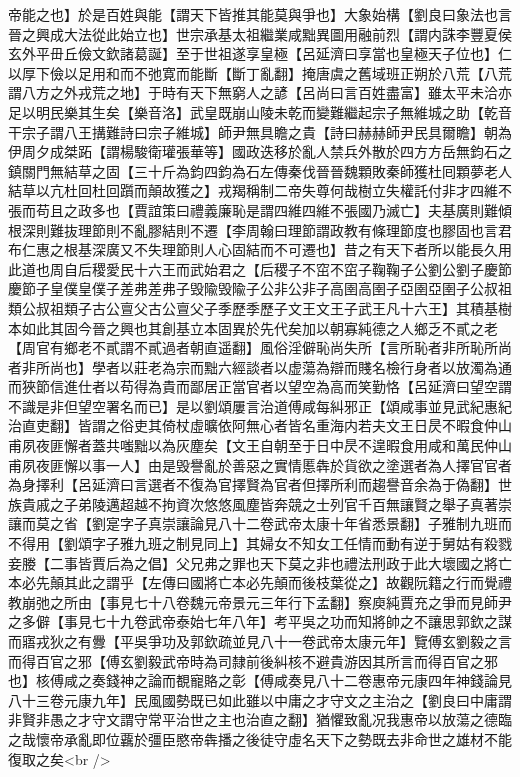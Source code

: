 帝能之也】於是百姓與能【謂天下皆推其能莫與爭也】大象始構【劉良曰象法也言晉之興成大法從此始立也】世宗承基太祖繼業咸黜異圖用融前烈【謂内誅李豐夏侯玄外平毌丘儉文欽諸葛誕】至于世祖遂享皇極【呂延濟曰享當也皇極天子位也】仁以厚下儉以足用和而不弛寛而能斷【斷丁亂翻】掩唐虞之舊域班正朔於八荒【八荒謂八方之外戎荒之地】于時有天下無窮人之諺【呂尚曰言百姓盡富】雖太平未洽亦足以明民樂其生矣【樂音洛】武皇既崩山陵未乾而變難繼起宗子無維城之助【乾音干宗子謂八王搆難詩曰宗子維城】師尹無具瞻之貴【詩曰赫赫師尹民具爾瞻】朝為伊周夕成桀跖【謂楊駿衛瓘張華等】國政迭移於亂人禁兵外散於四方方岳無鈞石之鎮關門無結草之固【三十斤為鈞四鈞為石左傳秦伐晉晉魏顆敗秦師獲杜囘顆夢老人結草以亢杜回杜回躓而顛故獲之】戎羯稱制二帝失尊何哉樹立失權託付非才四維不張而苟且之政多也【賈誼策曰禮義廉恥是謂四維四維不張國乃滅亡】夫基廣則難傾根深則難抜理節則不亂膠結則不遷【李周翰曰理節謂政教有條理節度也膠固也言君布仁惠之根基深廣又不失理節則人心固結而不可遷也】昔之有天下者所以能長久用此道也周自后稷愛民十六王而武始君之【后稷子不窋不窋子鞠鞠子公劉公劉子慶節慶節子皇僕皇僕子差弗差弗子毁隃毁隃子公非公非子高圉高圉子亞圉亞圉子公叔祖類公叔祖類子古公亶父古公亶父子季歷季歷子文王文王子武王凡十六王】其積基樹本如此其固今晉之興也其創基立本固異於先代矣加以朝寡純德之人鄉乏不貳之老【周官有鄉老不貳謂不貳過者朝直遥翻】風俗淫僻恥尚失所【言所恥者非所恥所尚者非所尚也】學者以莊老為宗而黜六經談者以虚蕩為辯而賤名檢行身者以放濁為通而狹節信進仕者以苟得為貴而鄙居正當官者以望空為高而笑勤恪【呂延濟曰望空謂不識是非但望空署名而已】是以劉頌屢言治道傅咸每糾邪正【頌咸事並見武紀惠紀治直吏翻】皆謂之俗吏其倚杖虛曠依阿無心者皆名重海内若夫文王日昃不暇食仲山甫夙夜匪懈者蓋共嗤黜以為灰塵矣【文王自朝至于日中昃不遑暇食用咸和萬民仲山甫夙夜匪懈以事一人】由是毁譽亂於善惡之實情慝犇於貨欲之塗選者為人擇官官者為身擇利【呂延濟曰言選者不復為官擇賢為官者但擇所利而趨譽音余為于偽翻】世族貴戚之子弟陵邁超越不拘資次悠悠風塵皆奔競之士列官千百無讓賢之舉子真著崇讓而莫之省【劉寔字子真崇讓論見八十二卷武帝太康十年省悉景翻】子雅制九班而不得用【劉頌字子雅九班之制見同上】其婦女不知女工任情而動有逆于舅姑有殺戮妾媵【二事皆賈后為之倡】父兄弗之罪也天下莫之非也禮法刑政于此大壞國之將亡本必先顛其此之謂乎【左傳曰國將亡本必先顛而後枝葉從之】故觀阮籍之行而覺禮教崩弛之所由【事見七十八卷魏元帝景元三年行下孟翻】察庾純賈充之爭而見師尹之多僻【事見七十九卷武帝泰始七年八年】考平吳之功而知將帥之不讓思郭欽之謀而寤戎狄之有釁【平吳爭功及郭欽疏並見八十一卷武帝太康元年】覽傅玄劉毅之言而得百官之邪【傅玄劉毅武帝時為司隸前後糾核不避貴游因其所言而得百官之邪也】核傅咸之奏錢神之論而覩寵賂之彰【傅咸奏見八十二卷惠帝元康四年神錢論見八十三卷元康九年】民風國勢既已如此雖以中庸之才守文之主治之【劉良曰中庸謂非賢非愚之才守文謂守常平治世之主也治直之翻】猶懼致亂况我惠帝以放蕩之德臨之哉懷帝承亂即位覊於彊臣愍帝犇播之後徒守虛名天下之勢既去非命世之雄材不能復取之矣<br />
